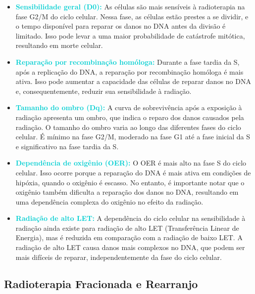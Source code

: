 \documentclass[11pt,a4paper]{article}
\begin{document}
	\begin{itemize}
		\item \textcolor{DarkTurquoise}{\textbf{Sensibilidade geral (D0):}} As células são mais sensíveis à radioterapia na fase G2/M do ciclo celular. Nessa fase, as células estão prestes a se dividir, e o tempo disponível para reparar os danos no DNA antes da divisão é limitado. Isso pode levar a uma maior probabilidade de catástrofe mitótica, resultando em morte celular.

		\item \textcolor{DarkTurquoise}{\textbf{Reparação por recombinação homóloga:}} Durante a fase tardia da S, após a replicação do DNA, a reparação por recombinação homóloga é mais ativa. Isso pode aumentar a capacidade das células de reparar danos no DNA e, consequentemente, reduzir sua sensibilidade à radiação.

		\item \textcolor{DarkTurquoise}{\textbf{Tamanho do ombro (Dq):}} A curva de sobrevivência após a exposição à radiação apresenta um ombro, que indica o reparo dos danos causados pela radiação. O tamanho do ombro varia ao longo das diferentes fases do ciclo celular. É mínimo na fase G2/M, moderado na fase G1 até a fase inicial da S e significativo na fase tardia da S.

		\item \textcolor{DarkTurquoise}{\textbf{Dependência de oxigênio (OER):}} O OER é mais alto na fase S do ciclo celular. Isso ocorre porque a reparação do DNA é mais ativa em condições de hipóxia, quando o oxigênio é escasso. No entanto, é importante notar que o oxigênio também dificulta a reparação dos danos no DNA, resultando em uma dependência complexa do oxigênio no efeito da radiação.

		\item \textcolor{DarkTurquoise}{\textbf{Radiação de alto LET:}} A dependência do ciclo celular na sensibilidade à radiação ainda existe para radiação de alto LET (Transferência Linear de Energia), mas é reduzida em comparação com a radiação de baixo LET. A radiação de alto LET causa danos mais complexos no DNA, que podem ser mais difíceis de reparar, independentemente da fase do ciclo celular.
	\end{itemize}

\subsection*{Radioterapia Fracionada e Rearranjo}
\end{document}

